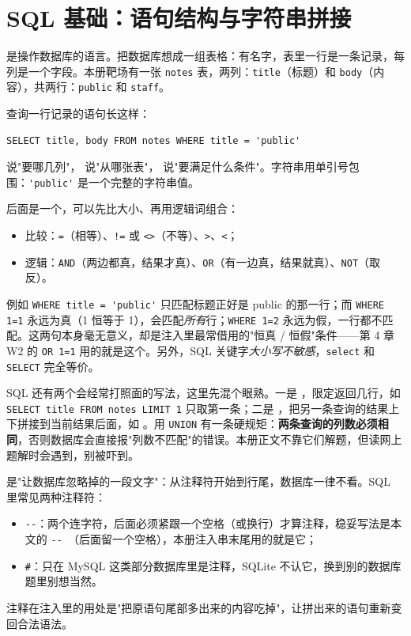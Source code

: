 \documentclass[UTF8,12pt,oneside]{ctexbook}
\begin{document}

\section{SQL 基础：语句结构与字符串拼接}
 是操作数据库的语言。把数据库想成一组表格：有名字，表里一行是一条记录，每列是一个字段。本册靶场有一张 \verb|notes| 表，两列：\verb|title|（标题）和 \verb|body|（内容），共两行：\verb|public| 和 \verb|staff|。

查询一行记录的语句长这样：
\begin{lstlisting}
SELECT title, body FROM notes WHERE title = 'public'
\end{lstlisting}
 说"要哪几列"， 说"从哪张表"， 说"要满足什么条件"。字符串用单引号包围：\verb|'public'| 是一个完整的字符串值。

 后面是一个，可以先比大小、再用逻辑词组合：
\begin{itemize}
\item 比较：\verb|=|（相等）、\verb|!=| 或 \verb|<>|（不等）、\verb|>|、\verb|<|；
\item 逻辑：\verb|AND|（两边都真，结果才真）、\verb|OR|（有一边真，结果就真）、\verb|NOT|（取反）。
\end{itemize}
例如 \verb|WHERE title = 'public'| 只匹配标题正好是 public 的那一行；而 \verb|WHERE 1=1| 永远为真（1 恒等于 1），会匹配\emph{所有}行；\verb|WHERE 1=2| 永远为假，一行都不匹配。这两句本身毫无意义，却是注入里最常借用的"恒真 / 恒假"条件——第 4 章 W2 的 \verb|OR 1=1| 用的就是这个。另外，SQL 关键字\emph{大小写不敏感}，\verb|select| 和 \verb|SELECT| 完全等价。

SQL 还有两个会经常打照面的写法，这里先混个眼熟。一是 ，限定返回几行，如 \verb|SELECT title FROM notes LIMIT 1| 只取第一条；二是 ，把另一条查询的结果上下拼接到当前结果后面，如 。用 \verb|UNION| 有一条硬规矩：\textbf{两条查询的列数必须相同}，否则数据库会直接报"列数不匹配"的错误。本册正文不靠它们解题，但读网上题解时会遇到，别被吓到。

是"让数据库忽略掉的一段文字"：从注释符开始到行尾，数据库一律不看。SQL 里常见两种注释符：
\begin{itemize}
\item \verb|--|：两个连字符，后面必须紧跟一个空格（或换行）才算注释，稳妥写法是本文的 \verb|-- |（后面留一个空格），本册注入串末尾用的就是它；
\item \verb|#|：只在 MySQL 这类部分数据库里是注释，SQLite 不认它，换到别的数据库题里别想当然。
\end{itemize}
注释在注入里的用处是"把原语句尾部多出来的内容吃掉"，让拼出来的语句重新变回合法语法。
\end{document}
